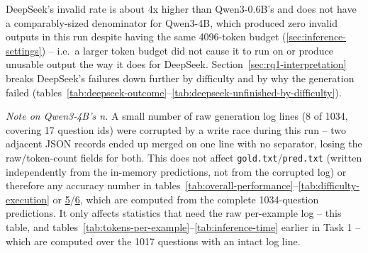 \documentclass[11pt]{article}
\begin{document}
DeepSeek's invalid rate is about 4x higher than Qwen3-0.6B's and does not have a comparably-sized denominator for Qwen3-4B, which produced zero invalid outputs in this run despite having the same 4096-token budget (\ref{sec:inference-settings}) -- i.e.\ a larger token budget did not cause it to run on or produce unusable output the way it does for DeepSeek. Section~\ref{sec:rq1-interpretation} breaks DeepSeek's failures down further by difficulty and by why the generation failed (tables~\ref{tab:deepseek-outcome}--\ref{tab:deepseek-unfinished-by-difficulty}).

\textit{Note on Qwen3-4B's n.} A small number of raw generation log lines (8 of 1034, covering 17 question ids) were corrupted by a write race during this run -- two adjacent JSON records ended up merged on one line with no separator, losing the raw/token-count fields for both. This does not affect \texttt{gold.txt}/\texttt{pred.txt} (written independently from the in-memory predictions, not from the corrupted log) or therefore any accuracy number in tables~\ref{tab:overall-performance}--\ref{tab:difficulty-execution} or \hyperref[tab:db-execution]{5}/\hyperref[tab:db-exact]{6}, which are computed from the complete 1034-question predictions. It only affects statistics that need the raw per-example log -- this table, and tables~\ref{tab:tokens-per-example}--\ref{tab:inference-time} earlier in Task 1 -- which are computed over the 1017 questions with an intact log line.
\end{document}
